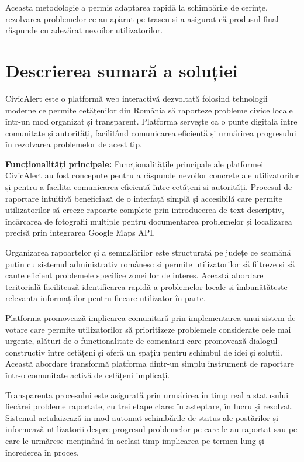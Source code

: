 \documentclass[12pt,a4paper]{report}
\begin{document}
Această metodologie a permis adaptarea rapidă la schimbările de cerințe, rezolvarea problemelor ce au apărut pe traseu și a asigurat că produsul final răspunde cu adevărat nevoilor utilizatorilor.

\section*{Descrierea sumară a soluției}

CivicAlert este o platformă web interactivă dezvoltată folosind tehnologii moderne  ce permite cetățenilor din România să raporteze probleme civice locale într-un mod organizat și transparent. Platforma servește ca o punte digitală între comunitate și autorități, facilitând comunicarea eficientă și urmărirea progresului în rezolvarea problemelor de acest tip.

\textbf{Funcționalități principale:}
Funcționalitățile principale ale platformei CivicAlert au fost concepute pentru a răspunde nevoilor concrete ale utilizatorilor și pentru a facilita comunicarea eficientă între cetățeni și autorități. Procesul de raportare intuitivă beneficiază de o interfață simplă și accesibilă care permite utilizatorilor să creeze rapoarte complete prin introducerea de text descriptiv, încărcarea de fotografii multiple pentru documentarea problemelor și localizarea precisă prin integrarea Google Maps API.

Organizarea rapoartelor și a semnalărilor este structurată pe județe ce seamănă puțin cu  sistemul administrativ românesc și permite utilizatorilor să filtreze și să caute eficient problemele specifice zonei lor de interes. Această abordare teritorială facilitează identificarea rapidă a problemelor locale și îmbunătățește relevanța informațiilor pentru fiecare utilizator în parte.

Platforma promovează implicarea comunitară prin implementarea unui sistem  de votare care permite utilizatorilor să prioritizeze problemele considerate cele mai urgente, alături de o funcționalitate de comentarii care promovează dialogul constructiv între cetățeni și oferă un spațiu pentru schimbul de idei și soluții. Această abordare transformă platforma dintr-un simplu instrument de raportare într-o comunitate activă de cetățeni implicați.

Transparența procesului este asigurată prin urmărirea în timp real a statusului fiecărei probleme raportate, cu trei etape clare: în așteptare, în lucru și rezolvat. Sistemul actulaizează in mod  automat schimbările de status ale postărilor și  informează utilizatorii despre progresul problemelor pe care le-au raportat sau pe care le urmăresc menținând în același timp implicarea pe termen lung și încrederea în proces.
\end{document}
